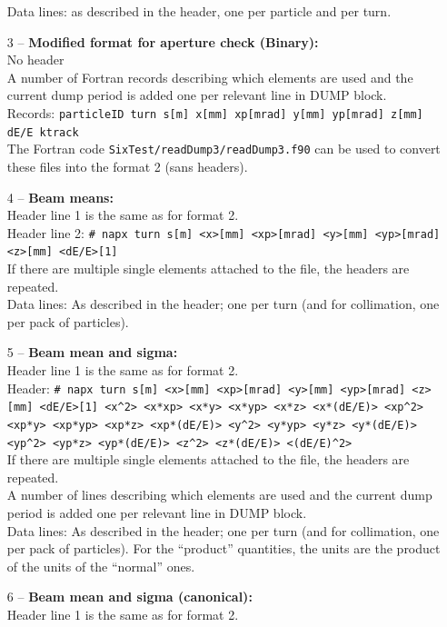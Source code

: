 \documentclass[a4paper,11pt]{report}
\begin{document}
\begin{enumerate}
	Data lines: as described in the header, one per particle and per turn.
        \item[3] -- \textbf{Modified format for aperture check (Binary):}\\
        No header\\
        A number of Fortran records describing which elements are used and the current dump period is added one per relevant line in DUMP block.\\
        Records: \texttt{particleID turn s[m] x[mm] xp[mrad] y[mm] yp[mrad] z[mm] dE/E ktrack}\\
        The Fortran code \texttt{SixTest/readDump3/readDump3.f90} can be used to convert these files into the format 2 (sans headers).
	\item[4] -- \textbf{Beam means:}\\
        Header line 1 is the same as for format 2.\\
        Header line 2: \texttt{\# napx turn s[m] <x>[mm] <xp>[mrad] <y>[mm] <yp>[mrad] <z>[mm] <dE/E>[1]}\\
        If there are multiple single elements attached to the file, the headers are repeated.\\
        Data lines: As described in the header; one per turn (and for collimation, one per pack of particles).
	\item[5] -- \textbf{Beam mean and sigma:}\\
        Header line 1 is the same as for format 2.\\
	Header: \texttt{\# napx turn s[m] <x>[mm] <xp>[mrad] <y>[mm] <yp>[mrad] <z>[mm] <dE/E>[1] <x\^{}2> <x*xp> <x*y> <x*yp> <x*z> <x*(dE/E)> <xp\^{}2> <xp*y> <xp*yp> <xp*z> <xp*(dE/E)> <y\^{}2> <y*yp> <y*z> <y*(dE/E)> <yp\^{}2> <yp*z> <yp*(dE/E)> <z\^{}2> <z*(dE/E)> <(dE/E)\^{}2>}\\
        If there are multiple single elements attached to the file, the headers are repeated.\\
	A number of lines describing which elements are used and the current dump period is added one per relevant line in DUMP block.\\
	Data lines: As described in the header; one per turn (and for collimation, one per pack of particles).
        For the ``product'' quantities, the units are the product of the units of the ``normal'' ones.
	\item[6] -- \textbf{Beam mean and sigma (canonical):}\\
        Header line 1 is the same as for format 2.\\

\end{enumerate}
\end{document}

